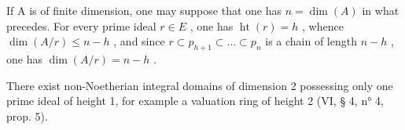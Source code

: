 If A is of finite dimension, one may suppose that one has \(n = \dim(A)\) in what precedes. For every prime ideal \(r \in E\) , one has \(\operatorname{ht}(r) = h\) , whence \(\dim(A/r) \leqslant n - h\) , and since \(r \subset p_{h+1} \subset \ldots \subset p_n\) is a chain of length \(n - h\) , one has \(\dim(A/r) = n - h\) .

There exist non-Noetherian integral domains of dimension 2 possessing only one prime ideal of height 1, for example a valuation ring of height 2 (VI, § 4, n° 4, prop. 5).

